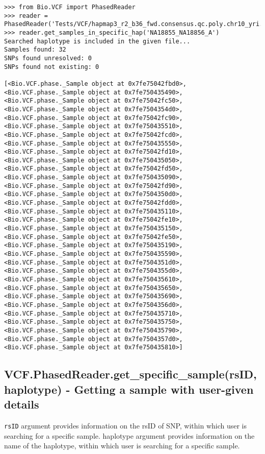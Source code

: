 \begin{verbatim}
>>> from Bio.VCF import PhasedReader
>>> reader = PhasedReader('Tests/VCF/hapmap3_r2_b36_fwd.consensus.qc.poly.chr10_yri.D.phased')
>>> reader.get_samples_in_specific_hap('NA18855_NA18856_A')
Searched haplotype is included in the given file...
Samples found: 32
SNPs found unresolved: 0
SNPs found not existing: 0

[<Bio.VCF.phase._Sample object at 0x7fe75042fbd0>, <Bio.VCF.phase._Sample object at 0x7fe750435490>, <Bio.VCF.phase._Sample object at 0x7fe75042fc50>, <Bio.VCF.phase._Sample object at 0x7fe7504354d0>, <Bio.VCF.phase._Sample object at 0x7fe75042fc90>, <Bio.VCF.phase._Sample object at 0x7fe750435510>, <Bio.VCF.phase._Sample object at 0x7fe75042fcd0>, <Bio.VCF.phase._Sample object at 0x7fe750435550>, <Bio.VCF.phase._Sample object at 0x7fe75042fd10>, <Bio.VCF.phase._Sample object at 0x7fe750435050>, <Bio.VCF.phase._Sample object at 0x7fe75042fd50>, <Bio.VCF.phase._Sample object at 0x7fe750435090>, <Bio.VCF.phase._Sample object at 0x7fe75042fd90>, <Bio.VCF.phase._Sample object at 0x7fe7504350d0>, <Bio.VCF.phase._Sample object at 0x7fe75042fdd0>, <Bio.VCF.phase._Sample object at 0x7fe750435110>, <Bio.VCF.phase._Sample object at 0x7fe75042fe10>, <Bio.VCF.phase._Sample object at 0x7fe750435150>, <Bio.VCF.phase._Sample object at 0x7fe75042fe50>, <Bio.VCF.phase._Sample object at 0x7fe750435190>, <Bio.VCF.phase._Sample object at 0x7fe750435590>, <Bio.VCF.phase._Sample object at 0x7fe7504351d0>, <Bio.VCF.phase._Sample object at 0x7fe7504355d0>, <Bio.VCF.phase._Sample object at 0x7fe750435610>, <Bio.VCF.phase._Sample object at 0x7fe750435650>, <Bio.VCF.phase._Sample object at 0x7fe750435690>, <Bio.VCF.phase._Sample object at 0x7fe7504356d0>, <Bio.VCF.phase._Sample object at 0x7fe750435710>, <Bio.VCF.phase._Sample object at 0x7fe750435750>, <Bio.VCF.phase._Sample object at 0x7fe750435790>, <Bio.VCF.phase._Sample object at 0x7fe7504357d0>, <Bio.VCF.phase._Sample object at 0x7fe750435810>]
\end{verbatim}

\subsection{VCF.PhasedReader.get\_specific\_sample(rsID, haplotype) - Getting a sample with user-given details}

\noindent \verb|rsID| argument provides information on the rsID of SNP, within which user is searching for a specific sample.
haplotype argument provides information on the name of the haplotype, within which user is searching for a specific sample.

